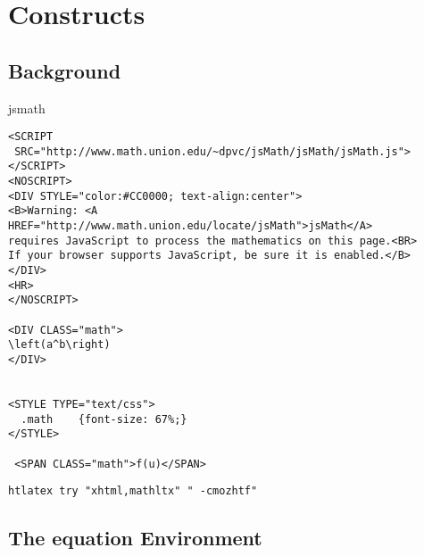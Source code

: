 %

\ifx \HTML\UnDef
   \def\HTML{mathltx,html-mltx} 
   \def\CONFIG{\jobname}
   \def\MAKETITLE{\author{Eitan M. Gurari}}
   \def\next{  \endinput}
   \expandafter\next
\fi




\chapter{Constructs}


\section{Background}

jsmath\EndLink


\begin{verbatim}
<SCRIPT
 SRC="http://www.math.union.edu/~dpvc/jsMath/jsMath/jsMath.js"></SCRIPT> 
<NOSCRIPT> 
<DIV STYLE="color:#CC0000; text-align:center"> 
<B>Warning: <A HREF="http://www.math.union.edu/locate/jsMath">jsMath</A> 
requires JavaScript to process the mathematics on this page.<BR> 
If your browser supports JavaScript, be sure it is enabled.</B> 
</DIV> 
<HR> 
</NOSCRIPT>
 
<DIV CLASS="math"> 
\left(a^b\right)
</DIV> 


<STYLE TYPE="text/css">
  .math    {font-size: 67%;}
</STYLE>

 <SPAN CLASS="math">f(u)</SPAN> 

\end{verbatim}

\begin{verbatim}
htlatex try "xhtml,mathltx" " -cmozhtf" 
\end{verbatim}

\section{The equation Environment}


